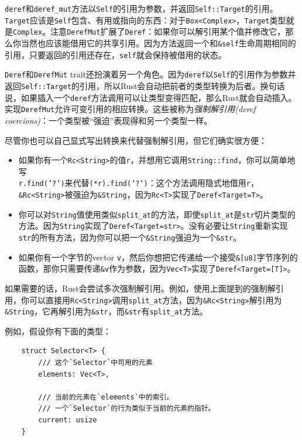 \texttt{deref}和\texttt{deref\_mut}方法以\texttt{Self}的引用为参数，并返回\texttt{Self::Target}的引用。\texttt{Target}应该是\texttt{Self}包含、有用或指向的东西：对于\texttt{Box<Complex>}，\texttt{Target}类型就是\texttt{Complex}。注意\texttt{DerefMut}扩展了\texttt{Deref}：如果你可以解引用某个值并修改它，那么你当然也应该能借用它的共享引用。因为方法返回一个和\texttt{\&self}生命周期相同的引用，只要返回的引用还存在，\texttt{self}就会保持被借用的状态。

\texttt{Deref}和\texttt{DerefMut} trait还扮演着另一个角色。因为\texttt{deref}以\texttt{Self}的引用作为参数并返回\texttt{Self::Target}的引用，所以Rust会自动把前者的类型转换为后者。换句话说，如果插入一个\texttt{deref}方法调用可以让类型变得匹配，那么Rust就会自动插入。实现\texttt{DerefMut}允许可变引用的相应转换。这些被称为\emph{强制解引用(deref coercions)}：一个类型被“强迫”表现得和另一个类型一样。

尽管你也可以自己显式写出转换来代替强制解引用，但它们确实很方便：
\begin{itemize}
    \item 如果你有一个\texttt{Rc<String>}的值\texttt{r}，并想用它调用\texttt{String::find}，你可以简单地写\\
    \texttt{r.find('?')}来代替\texttt{(*r).find('?')}：这个方法调用隐式地借用\texttt{r}，\texttt{\&Rc<String>}被强迫为\texttt{\&String}，因为\texttt{Rc<T>}实现了\texttt{Deref<Target=T>}。
    \item 你可以对\texttt{String}值使用类似\texttt{split\_at}的方法，即使\texttt{split\_at}是\texttt{str}切片类型的方法。因为\texttt{String}实现了\texttt{Deref<Target=str>}。没有必要让\texttt{String}重新实现\texttt{str}的所有方法，因为你可以把一个\texttt{\&String}强迫为一个\texttt{\&str}。
    \item 如果你有一个字节的vector \texttt{v}，然后你想把它传递给一个接受\texttt{\&[u8]}字节序列的函数，那你只需要传递\texttt{\&v}作为参数，因为\texttt{Vec<T>}实现了\texttt{Deref<Target=[T]>}。
\end{itemize}

如果需要的话，Rust会尝试多次强制解引用。例如，使用上面提到的强制解引用，你可以直接用\texttt{Rc<String>}调用\texttt{split\_at}方法，因为\texttt{\&Rc<String>}解引用为\texttt{\&String}，它再解引用为\texttt{\&str}，而\texttt{\&str}有\texttt{split\_at}方法。

例如，假设你有下面的类型：
\begin{verbatim}
    struct Selector<T> {
        /// 这个`Selector`中可用的元素
        elements: Vec<T>,

        /// 当前的元素在`elements`中的索引。
        /// 一个`Selector`的行为类似于当前的元素的指针。
        current: usize
    }
\end{verbatim}

